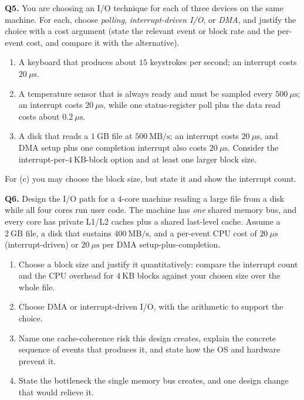 \documentclass[11pt]{article}
\begin{document}
\textbf{Q5.} You are choosing an I/O technique for each of three devices on the same machine. For each, choose \emph{polling}, \emph{interrupt-driven I/O}, or \emph{DMA}, and justify the choice with a cost argument (state the relevant event or block rate and the per-event cost, and compare it with the alternative).
\begin{enumerate}
  \item[(a)] A keyboard that produces about $15$ keystrokes per second; an interrupt costs $20\ \mu\text{s}$.
  \item[(b)] A temperature sensor that is always ready and must be sampled every $500\ \mu\text{s}$; an interrupt costs $20\ \mu\text{s}$, while one status-register poll plus the data read costs about $0.2\ \mu\text{s}$.
  \item[(c)] A disk that reads a $1\ \text{GB}$ file at $500\ \text{MB/s}$; an interrupt costs $20\ \mu\text{s}$, and DMA setup plus one completion interrupt also costs $20\ \mu\text{s}$. Consider the interrupt-per-$4\ \text{KB}$-block option and at least one larger block size.
\end{enumerate}
For (c) you may choose the block size, but state it and show the interrupt count.

\textbf{Q6.} Design the I/O path for a 4-core machine reading a large file from a disk while all four cores run user code. The machine has \emph{one} shared memory bus, and every core has private L1/L2 caches plus a shared last-level cache. Assume a $2\ \text{GB}$ file, a disk that sustains $400\ \text{MB/s}$, and a per-event CPU cost of $20\ \mu\text{s}$ (interrupt-driven) or $20\ \mu\text{s}$ per DMA setup-plus-completion.
\begin{enumerate}
  \item[(a)] Choose a block size and justify it quantitatively: compare the interrupt count and the CPU overhead for $4\ \text{KB}$ blocks against your chosen size over the whole file.
  \item[(b)] Choose DMA or interrupt-driven I/O, with the arithmetic to support the choice.
  \item[(c)] Name one cache-coherence risk this design creates, explain the concrete sequence of events that produces it, and state how the OS and hardware prevent it.
  \item[(d)] State the bottleneck the single memory bus creates, and one design change that would relieve it.
\end{enumerate}
\end{document}
